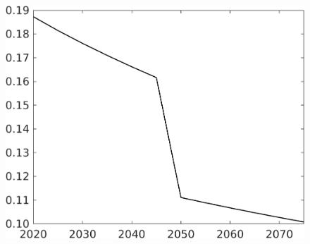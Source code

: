 \documentclass[12pt]{article}
\begin{document}
\begin{figure}[h!!]
\begin{minipage}[]{0.32\textwidth}
	\end{minipage}		
	\begin{minipage}[]{0.32\textwidth}
		\includegraphics[width=1\textwidth]{../../codding_model/own_basedOnFried/optimalPol_010922_revision/figures/all_13Sept22/CompTaufPER_bytaul_Reg0_EY_spillover0_nsk0_xgr1_knspil0_sep0_LFlimit1_emsbase0_countec0_GovRev0_etaa0.79_lgd0.png}
	\end{minipage}	
\end{figure}
\end{document}

